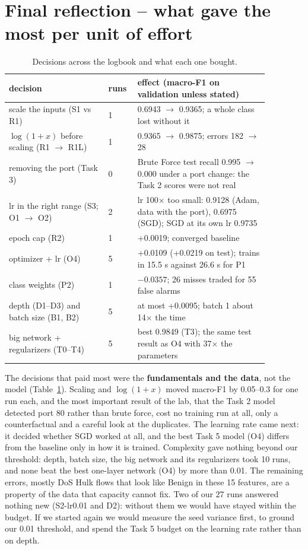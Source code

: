 \documentclass[9pt]{extarticle}
\newcommand{\run}[1]{\textsf{#1}}
\begin{document}
\section{Final reflection -- what gave the most per unit of effort}
\begin{table}[h]
\centering\small
\begin{tabular}{p{0.34\linewidth}p{0.08\linewidth}p{0.45\linewidth}}
\toprule
decision & runs & effect (macro-F1 on validation unless stated) \\
\midrule
scale the inputs (\run{S1} vs \run{R1}) & 1 & 0.6943 $\rightarrow$ 0.9365; a whole class lost without it \\
$\log(1+x)$ before scaling (\run{R1} $\rightarrow$ \run{R1L}) & 1 & 0.9365 $\rightarrow$ 0.9875; errors 182 $\rightarrow$ 28 \\
removing the port (Task 3) & 0 & Brute Force test recall 0.995 $\rightarrow$ 0.000 under a port change: the Task 2 scores were not real \\
lr in the right range (\run{S3}; \run{O1} $\rightarrow$ \run{O2}) & 2 & lr 100$\times$ too small: 0.9128 (Adam, data with the port), 0.6975 (SGD); SGD at its own lr 0.9735 \\
epoch cap (\run{R2}) & 1 & +0.0019; converged baseline \\
optimizer + lr (\run{O4}) & 5 & +0.0109 (+0.0219 on test); trains in 15.5 s against 26.6 s for \run{P1} \\
class weights (\run{P2}) & 1 & $-0.0357$; 26 misses traded for 55 false alarms \\
depth (\run{D1}--\run{D3}) and batch size (\run{B1}, \run{B2}) & 5 & at most +0.0095; batch 1 about 14$\times$ the time \\
big network + regularizers (\run{T0}--\run{T4}) & 5 & best 0.9849 (\run{T3}); the same test result as \run{O4} with 37$\times$ the parameters \\
\bottomrule
\end{tabular}
\caption{Decisions across the logbook and what each one bought.}
\label{tab:final}
\end{table}

The decisions that paid most were the \textbf{fundamentals and the data}, not the model (Table~\ref{tab:final}). Scaling and $\log(1+x)$ moved macro-F1 by 0.05--0.3 for one run each, and the most important result of the lab, that the Task 2 model detected port 80 rather than brute force, cost no training run at all, only a counterfactual and a careful look at the duplicates. The learning rate came next: it decided whether SGD worked at all, and the best Task 5 model (\run{O4}) differs from the baseline only in how it is trained. Complexity gave nothing beyond our threshold: depth, batch size, the big network and its regularizers took 10 runs, and none beat the best one-layer network (\run{O4}) by more than 0.01. The remaining errors, mostly DoS Hulk flows that look like Benign in these 15 features, are a property of the data that capacity cannot fix. Two of our 27 runs answered nothing new (\run{S2-lr0.01} and \run{D2}): without them we would have stayed within the budget. If we started again we would measure the seed variance first, to ground our 0.01 threshold, and spend the Task 5 budget on the learning rate rather than on depth.

\clearpage
\appendix

\end{document}
